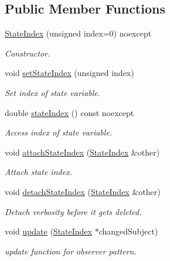\subsection*{Public Member Functions}
\begin{DoxyCompactItemize}
\item 
\hyperlink{classSpacy_1_1Mixin_1_1StateIndex_a0dfcecf87c0982d6c4d8859661aad1fa_a0dfcecf87c0982d6c4d8859661aad1fa}{State\+Index} (unsigned index=0) noexcept
\begin{DoxyCompactList}\small\item\em Constructor. \end{DoxyCompactList}\item 
void \hyperlink{classSpacy_1_1Mixin_1_1StateIndex_a7547d4239437b878cde8a60a95b0b319_a7547d4239437b878cde8a60a95b0b319}{set\+State\+Index} (unsigned index)
\begin{DoxyCompactList}\small\item\em Set index of state variable. \end{DoxyCompactList}\item 
double \hyperlink{classSpacy_1_1Mixin_1_1StateIndex_a8f6d3b42f3ffe6698ed9915355d22baa_a8f6d3b42f3ffe6698ed9915355d22baa}{state\+Index} () const noexcept
\begin{DoxyCompactList}\small\item\em Access index of state variable. \end{DoxyCompactList}\item 
void \hyperlink{classSpacy_1_1Mixin_1_1StateIndex_af307c6e75fe7839a3f74ea400b9aea4a_af307c6e75fe7839a3f74ea400b9aea4a}{attach\+State\+Index} (\hyperlink{classSpacy_1_1Mixin_1_1StateIndex}{State\+Index} \&other)
\begin{DoxyCompactList}\small\item\em Attach state index. \end{DoxyCompactList}\item 
\hypertarget{classSpacy_1_1Mixin_1_1StateIndex_ac193f8197435643fb7f509756607e464}{}void \hyperlink{classSpacy_1_1Mixin_1_1StateIndex_ac193f8197435643fb7f509756607e464}{detach\+State\+Index} (\hyperlink{classSpacy_1_1Mixin_1_1StateIndex}{State\+Index} \&other)\label{classSpacy_1_1Mixin_1_1StateIndex_ac193f8197435643fb7f509756607e464}

\begin{DoxyCompactList}\small\item\em Detach verbosity before it gets deleted. \end{DoxyCompactList}\item 
\hypertarget{classSpacy_1_1Mixin_1_1StateIndex_a632299c8de748ea73d1fcbbb4d8f734a}{}void \hyperlink{classSpacy_1_1Mixin_1_1StateIndex_a632299c8de748ea73d1fcbbb4d8f734a}{update} (\hyperlink{classSpacy_1_1Mixin_1_1StateIndex}{State\+Index} $\ast$changed\+Subject)\label{classSpacy_1_1Mixin_1_1StateIndex_a632299c8de748ea73d1fcbbb4d8f734a}

\begin{DoxyCompactList}\small\item\em update function for observer pattern. \end{DoxyCompactList}\end{DoxyCompactItemize}
